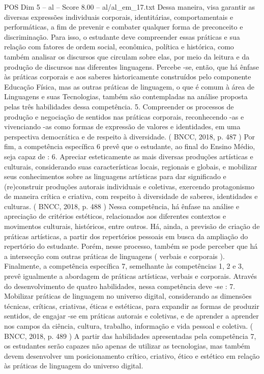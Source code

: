 \begin{textsample}{POS Dim 5 – al – Score 8.00 – al/al\_em\_17.txt}
Dessa maneira, visa garantir as diversas expressões individuais corporais, identitárias, comportamentais e performáticas, a fim de prevenir e combater qualquer forma de preconceito e discriminação.
Para isso, o estudante deve compreender essas práticas e sua relação com fatores de ordem social, econômica, política e histórica, como também analisar os discursos que circulam sobre elas, por meio da leitura e da produção de discursos nas diferentes linguagens.
Percebe -se, então, que há ênfase às práticas corporais e aos saberes historicamente construídos pelo componente Educação Física, mas as outras práticas de linguagem, o que é comum à área de Linguagens e suas Tecnologias, também são contempladas na análise proposta pelas três habilidades dessa competência. 5.
Compreender os processos de produção e negociação de sentidos nas práticas corporais, reconhecendo -as e vivenciando -as como formas de expressão de valores e identidades, em uma perspectiva democrática e de respeito à diversidade. ( BNCC, 2018, p. 487 ) Por fim, a competência específica 6 prevê que o estudante, ao final do Ensino Médio, seja capaz de : 6.
Apreciar esteticamente as mais diversas produções artísticas e culturais, considerando suas características locais, regionais e globais, e mobilizar seus conhecimentos sobre as linguagens artísticas para dar significado e (re)construir produções autorais individuais e coletivas, exercendo protagonismo de maneira crítica e criativa, com respeito à diversidade de saberes, identidades e culturas. ( BNCC, 2018, p. 488 ) Nessa competência, há ênfase na análise e apreciação de critérios estéticos, relacionados aos diferentes contextos e movimentos culturais, históricos, entre outros.
Há, ainda, a previsão de criação de práticas artísticas, a partir dos repertórios pessoais em busca da ampliação do repertório do estudante.
Porém, nesse processo, também se pode perceber que há a intersecção com outras práticas de linguagens ( verbais e corporais ).
Finalmente, a competência específica 7, semelhante às competências 1, 2 e 3, prevê igualmente a abordagem de práticas artísticas, verbais e corporais.
Através do desenvolvimento de quatro habilidades, nessa competência deve -se : 7.
Mobilizar práticas de linguagem no universo digital, considerando as dimensões técnicas, críticas, criativas, éticas e estéticas, para expandir as formas de produzir sentidos, de engajar -se em práticas autorais e coletivas, e de aprender a aprender nos campos da ciência, cultura, trabalho, informação e vida pessoal e coletiva. ( BNCC, 2018, p. 489 ) A partir das habilidades apresentadas pela competência 7, os estudantes serão capazes não apenas de utilizar as tecnologias, mas também devem desenvolver um posicionamento crítico, criativo, ético e estético em relação às práticas de linguagem do universo digital.

\end{textsample}
